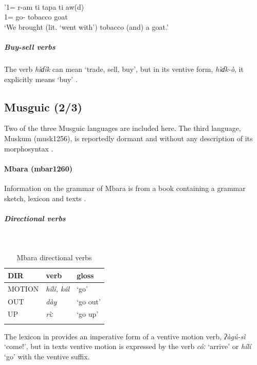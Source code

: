 \ea\label{ex2:gizi3}
 \\
\gll  '1= r-am ti tapa ti aw(d) \\
1= go-  tobacco  goat \\
\glt `We brought (lit. ‘went with’) tobacco (and) a goat.'
\z 

\subparagraph{Buy-sell verbs}

The verb \textit{hìɗík} can mean `trade, sell, buy', but in its ventive form, \textit{hìɗk-ò}, it explicitly means `buy' \citep[150]{shayGrammarGizigaChadic2021}. 

\subsection{Musguic (2/3)}

Two of the three Musguic languages are included here. The third language, Muskum (musk1256), is reportedly dormant and without any description of its morphosyntax \citep{tourneuxLangueTchadiqueDisparue1977}.

\paragraph*{Mbara (mbar1260)} \label{mbar}

Information on the grammar of Mbara is from a book containing a grammar sketch, lexicon and texts \citep{tourneuxMbaraLeurLangue1986}.

\newpage
\subparagraph{Directional verbs}~

\begin{table}[H]
	\caption{Mbara directional verbs} 
	\label{tab:mbarV}
	\begin{tabular}{lll} %
		\lsptoprule
		DIR & verb & gloss   \\ %
		\midrule
		MOTION & \textit{hílí, kál} & `go' \\
		OUT & \textit{dày} & `go out' \\
		UP & \textit{rìː} & `go up' \\
		\lspbottomrule
	\end{tabular}
\end{table}

The lexicon in \citet{tourneuxMbaraLeurLangue1986} provides an imperative form of a ventive motion verb, \textit{ʔàgú-sì} `come!', but in texts ventive motion is expressed by the verb \textit{cóː} `arrive' or \textit{hílí} `go' with the ventive suffix.

